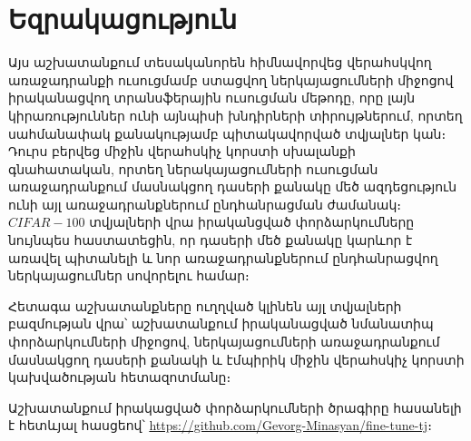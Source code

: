 \documentclass[12pt]{article}
\begin{document}
\pagebreak

\section*{\hfill Եզրակացություն \hfill} \noindent
{}
{}


\par Այս աշխատանքում տեսականորեն հիմնավորվեց վերահսկվող առաջադրանքի ուսուցմամբ ստացվող ներկայացումների միջոցով իրականացվող տրանսֆերային ուսուցման մեթոդը, որը լայն կիրառություններ ունի այնպիսի խնդիրների տիրույթներում, որտեղ սահմանափակ քանակությամբ պիտակավորված տվյալներ կան։ Դուրս բերվեց միջին վերահսկիչ կորստի սխալանքի գնահատական, որտեղ ներակայացումների ուսուցման առաջադրանքում մասնակցող դասերի քանակը մեծ ազդեցություն ունի այլ առաջադրանքներում ընդհանրացման ժամանակ։ $CIFAR-100$ տվյալների վրա իրականցված փորձարկումները նույնպես հաստատեցին, որ դասերի մեծ քանակը կարևոր է  առավել պիտանելի և նոր առաջադրանքներում ընդհանրացվող ներկայացումներ սովորելու համար։
\par Հետագա աշխատանքները ուղղված կլինեն այլ տվյալների բազմության վրա՝ աշխատանքում իրականացված նմանատիպ փորձարկումների միջոցով, ներկայացումների առաջադրանքում մասնակցող դասերի քանակի և էմպիրիկ միջին վերահսկիչ կորստի կախվածության հետազոտմանը։

Աշխատանքում իրակացված փորձարկումների ծրագիրը հասանելի է հետևյալ հասցեով՝ \url{https://github.com/Gevorg-Minasyan/fine-tune-tj}։
  
\end{document}

